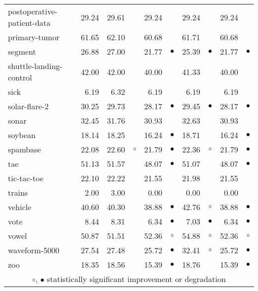 {\begin{longtable}{lrr@{\hspace{0.1cm}}cr@{\hspace{0.1cm}}cr@{\hspace{0.1cm}}cr@{\hspace{0.1cm}}c}
postoperative-patient-data & 29.24 & 29.61 &          & 29.24 &           & 29.24 &           & 29.24 &          \\
primary-tumor & 61.65 & 62.10 &          & 60.68 &           & 61.71 &           & 60.68 &          \\
segment & 26.88 & 27.00 &          & 21.77 & $\bullet$ & 25.39 & $\bullet$ & 21.77 & $\bullet$\\
shuttle-landing-control & 42.00 & 42.00 &          & 40.00 &           & 41.33 &           & 40.00 &          \\
sick &  6.19 &  6.32 &          &  6.19 &           &  6.19 &           &  6.19 &          \\
solar-flare-2 & 30.25 & 29.73 &          & 28.17 & $\bullet$ & 29.45 & $\bullet$ & 28.17 & $\bullet$\\
sonar & 32.45 & 31.76 &          & 30.93 &           & 32.63 &           & 30.93 &          \\
soybean & 18.14 & 18.25 &          & 16.24 & $\bullet$ & 18.71 &           & 16.24 & $\bullet$\\
spambase & 22.08 & 22.60 &  $\circ$ & 21.79 & $\bullet$ & 22.36 &   $\circ$ & 21.79 & $\bullet$\\
tae & 51.13 & 51.57 &          & 48.07 & $\bullet$ & 51.07 &           & 48.07 & $\bullet$\\
tic-tac-toe & 22.10 & 22.22 &          & 21.55 &           & 21.98 &           & 21.55 &          \\
trains &  2.00 &  3.00 &          &  0.00 &           &  0.00 &           &  0.00 &          \\
vehicle & 40.60 & 40.30 &          & 38.88 & $\bullet$ & 42.76 &   $\circ$ & 38.88 & $\bullet$\\
vote &  8.44 &  8.31 &          &  6.34 & $\bullet$ &  7.03 & $\bullet$ &  6.34 & $\bullet$\\
vowel & 50.87 & 51.51 &          & 52.36 &   $\circ$ & 54.88 &   $\circ$ & 52.36 &   $\circ$\\
waveform-5000 & 27.54 & 27.48 &          & 25.72 & $\bullet$ & 32.41 &   $\circ$ & 25.72 & $\bullet$\\
zoo & 18.35 & 18.56 &          & 15.39 & $\bullet$ & 18.76 &           & 15.39 & $\bullet$\\
\hline
\multicolumn{10}{c}{$\circ$, $\bullet$ statistically significant improvement or degradation}\\
\end{longtable} \footnotesize \par}